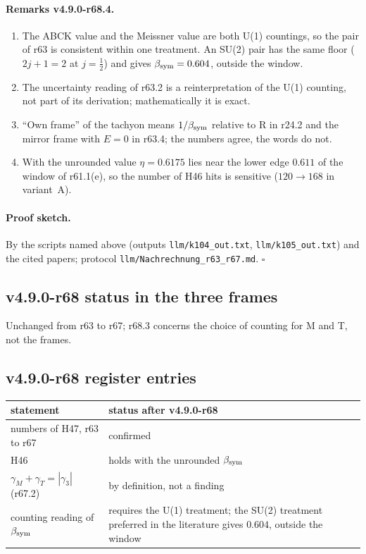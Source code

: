 \paragraph{Remarks v4.9.0-r68.4.}
\begin{enumerate}[leftmargin=2em]
\item The ABCK value and the Meissner value are both U(1) countings, so the pair of r63 is consistent within one treatment.  An SU(2) pair has the same floor
(\(2j+1=2\) at \(j=\tfrac12\)) and gives \(\beta_{\mathrm{sym}}=0.604\), outside the window.
\item The uncertainty reading of r63.2 is a reinterpretation of the U(1) counting, not part of its derivation; mathematically it is exact.
\item ``Own frame'' of the tachyon means \(1/\beta_{\mathrm{sym}}\) relative to R in r24.2 and the mirror frame with \(E=0\) in r63.4; the numbers agree, the words do not.
\item With the unrounded value \(\eta=0.6175\) lies near the lower edge \(0.611\) of the window of r61.1(e), so the number of H46 hits is sensitive
(\(120\to168\) in variant~A).
\end{enumerate}

\paragraph{Proof sketch.}
By the scripts named above (outputs \texttt{llm/k104\_out.txt}, \texttt{llm/k105\_out.txt}) and the cited papers; protocol \texttt{llm/Nachrechnung\_r63\_r67.md}.
\(\square\)

\subsection*{v4.9.0-r68 status in the three frames}
\label{subsec:v490-r68-frames}

Unchanged from r63 to r67; r68.3 concerns the choice of counting for M and T, not the frames.

\subsection*{v4.9.0-r68 register entries}
\label{subsec:v490-r68-register}

\begin{center}
\small
\begin{tabular}{@{}>{\raggedright\arraybackslash}p{}>{\raggedright\arraybackslash}p{}@{}}
\toprule
statement & status after v4.9.0-r68\\
\midrule
numbers of H47, r63 to r67 & confirmed\\
H46 & holds with the unrounded \(\beta_{\mathrm{sym}}\)\\
\(\gamma_M+\gamma_T=|\gamma_3|\) (r67.2) & by definition, not a finding\\
counting reading of \(\beta_{\mathrm{sym}}\) & requires the U(1) treatment; the SU(2) treatment preferred in the literature gives \(0.604\), outside the window\\
\bottomrule
\end{tabular}
\end{center}

